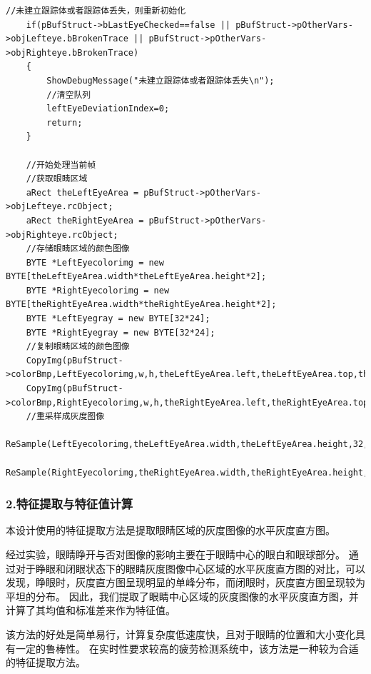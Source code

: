 \documentclass[12pt,hyperref,a4paper,UTF8]{ctexart}
\begin{document}
        \begin{lstlisting}[caption={判断跟踪体建立与重采样}, label={lst:example}]
	//未建立跟踪体或者跟踪体丢失，则重新初始化
	if(pBufStruct->bLastEyeChecked==false || pBufStruct->pOtherVars->objLefteye.bBrokenTrace || pBufStruct->pOtherVars->objRighteye.bBrokenTrace)
	{
		ShowDebugMessage("未建立跟踪体或者跟踪体丢失\n");
		//清空队列
		leftEyeDeviationIndex=0;
		return;
	}

	//开始处理当前帧
	//获取眼睛区域
	aRect theLeftEyeArea = pBufStruct->pOtherVars->objLefteye.rcObject;
	aRect theRightEyeArea = pBufStruct->pOtherVars->objRighteye.rcObject;
	//存储眼睛区域的颜色图像
	BYTE *LeftEyecolorimg = new BYTE[theLeftEyeArea.width*theLeftEyeArea.height*2];
	BYTE *RightEyecolorimg = new BYTE[theRightEyeArea.width*theRightEyeArea.height*2];
	BYTE *LeftEyegray = new BYTE[32*24];
	BYTE *RightEyegray = new BYTE[32*24];
	//复制眼睛区域的颜色图像
	CopyImg(pBufStruct->colorBmp,LeftEyecolorimg,w,h,theLeftEyeArea.left,theLeftEyeArea.top,theLeftEyeArea.width,theLeftEyeArea.height);
	CopyImg(pBufStruct->colorBmp,RightEyecolorimg,w,h,theRightEyeArea.left,theRightEyeArea.top,theRightEyeArea.width,theRightEyeArea.height);
	//重采样成灰度图像
	ReSample(LeftEyecolorimg,theLeftEyeArea.width,theLeftEyeArea.height,32,24,false,true,LeftEyegray);
	ReSample(RightEyecolorimg,theRightEyeArea.width,theRightEyeArea.height,32,24,false,true,RightEyegray);
        \end{lstlisting}

        \subsubsection*{\large \textbf{2.特征提取与特征值计算}}
        本设计使用的特征提取方法是提取眼睛区域的灰度图像的水平灰度直方图。

        经过实验，眼睛睁开与否对图像的影响主要在于眼睛中心的眼白和眼球部分。
        通过对于睁眼和闭眼状态下的眼睛灰度图像中心区域的水平灰度直方图的对比，可以发现，睁眼时，灰度直方图呈现明显的单峰分布，而闭眼时，灰度直方图呈现较为平坦的分布。
        因此，我们提取了眼睛中心区域的灰度图像的水平灰度直方图，并计算了其均值和标准差来作为特征值。

        该方法的好处是简单易行，计算复杂度低速度快，且对于眼睛的位置和大小变化具有一定的鲁棒性。
        在实时性要求较高的疲劳检测系统中，该方法是一种较为合适的特征提取方法。
\end{document}
